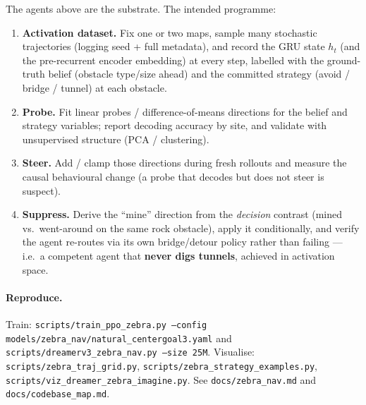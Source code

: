 \documentclass[11pt]{article}
\newcommand{\code}[1]{\texttt{#1}}
\begin{document}
The agents above are the substrate. The intended programme:
\begin{enumerate}[leftmargin=1.4em]
\item \textbf{Activation dataset.} Fix one or two maps, sample many stochastic
trajectories (logging seed + full metadata), and record the GRU state $h_t$ (and
the pre-recurrent encoder embedding) at every step, labelled with the
ground-truth belief (obstacle type/size ahead) and the committed strategy
(avoid / bridge / tunnel) at each obstacle.
\item \textbf{Probe.} Fit linear probes / difference-of-means directions for the
belief and strategy variables; report decoding accuracy by site, and validate with
unsupervised structure (PCA / clustering).
\item \textbf{Steer.} Add / clamp those directions during fresh rollouts and
measure the causal behavioural change (a probe that decodes but does not steer is
suspect).
\item \textbf{Suppress.} Derive the ``mine'' direction from the \emph{decision}
contrast (mined vs.\ went-around on the same rock obstacle), apply it conditionally,
and verify the agent re-routes via its own bridge/detour policy rather than
failing --- i.e.\ a competent agent that \textbf{never digs tunnels}, achieved in
activation space.
\end{enumerate}

\paragraph{Reproduce.} Train: \code{scripts/train\_ppo\_zebra.py --config
models/zebra\_nav/natural\_centergoal3.yaml} and \code{scripts/dreamerv3\_zebra\_nav.py
--size 25M}. Visualise: \code{scripts/zebra\_traj\_grid.py},
\code{scripts/zebra\_strategy\_examples.py}, \code{scripts/viz\_dreamer\_zebra\_imagine.py}.
See \code{docs/zebra\_nav.md} and \code{docs/codebase\_map.md}.
\end{document}
